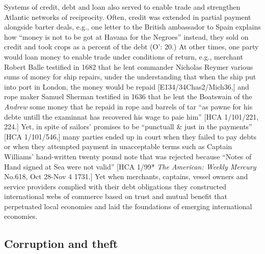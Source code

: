 Systems of credit, debt and loan also served to enable trade and strengthen Atlantic networks of reciprocity. Often, credit was extended in partial payment alongside barter deals, e.g., one letter to the British ambassador to Spain explains how “money is not to be got at Havana for the Negroes” instead, they sold on credit and took crops as a percent of the debt (O’\citealt{Malley2016}: 20.) At other times, one party would loan money to enable trade under conditions of return, e.g., merchant Robert Balle testified in 1682 that he lent commander Nicholas Reymer various sums of money for ship repairs, under the understanding that when the ship put into port in London, the money would be repaid [E134/34Chas2/Mich36,] and rope maker Samuel Sherman testified in 1636 that he lent the Boatswain of the \textit{Andrew} some money that he repaid in rope and barrels of tar “as pawne for his debte untill the examinnat has recovered his wage to paie him” [HCA 1/101/221, 224.] Yet, in spite of sailors’ promises to be “punctuall \& just in the payments” [HCA 1/101/546,] many parties ended up in court when they failed to pay debts or when they attempted payment in unacceptable terms such as Captain Williams’ hand-written twenty pound note that was rejected because “Notes of Hand signed at Sea were not valid” [HCA 1/99* \textit{The American: Weekly Mercury} No.618, Oct 28-Nov 4 1731.] Yet when merchants, captains, vessel owners and service providers complied with their debt obligations they constructed international webs of commerce based on trust and mutual benefit that perpetuated local economies and laid the foundations of emerging international economies. 

\subsection{{Corruption} {and} {theft}}%

